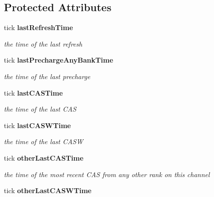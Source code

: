 \subsection*{Protected Attributes}
\begin{DoxyCompactItemize}
\item 
tick {\bf lastRefreshTime}\label{class_d_r_a_msim_i_i_1_1_rank_a578cb670379069e5da1d4c6adfb8b9a2}

\begin{DoxyCompactList}\small\item\em the time of the last refresh \item\end{DoxyCompactList}\item 
tick {\bf lastPrechargeAnyBankTime}\label{class_d_r_a_msim_i_i_1_1_rank_a23d9e3d09a3e91d61836dee2e03417d9}

\begin{DoxyCompactList}\small\item\em the time of the last precharge \item\end{DoxyCompactList}\item 
tick {\bf lastCASTime}\label{class_d_r_a_msim_i_i_1_1_rank_aca702047caedeece756f58cd22bcf643}

\begin{DoxyCompactList}\small\item\em the time of the last CAS \item\end{DoxyCompactList}\item 
tick {\bf lastCASWTime}\label{class_d_r_a_msim_i_i_1_1_rank_ad25621bb78bc5740af9c467022ad5ff1}

\begin{DoxyCompactList}\small\item\em the time of the last CASW \item\end{DoxyCompactList}\item 
tick {\bf otherLastCASTime}\label{class_d_r_a_msim_i_i_1_1_rank_a793b3e2860f080b65859b8c64722182a}

\begin{DoxyCompactList}\small\item\em the time of the most recent CAS from any other rank on this channel \item\end{DoxyCompactList}\item 
tick {\bf otherLastCASWTime}\label{class_d_r_a_msim_i_i_1_1_rank_a77dd4d8609b160c5ec6db3191a4d87d3}


\end{DoxyCompactItemize}
